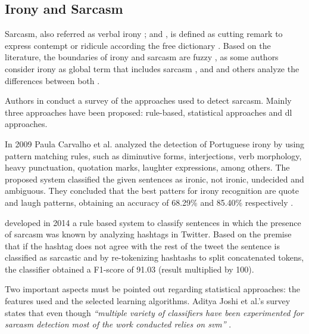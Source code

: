 \subsection{Irony and Sarcasm}
\label{subsec:irony_sarcasm}

Sarcasm, also referred as verbal irony \cite{giora2013negation}; \cite{giora2015defaultness} and \cite{giora2015default}, is defined as cutting remark to express contempt or ridicule according the free dictionary \cite{sarcasmFreeDictionary}. Based on the literature, the boundaries of irony and sarcasm are fuzzy \cite{bosco2013developing}, as some authors consider irony as global term that includes sarcasm \cite{gibbs1991psychological}, \cite{wilson2006pragmatics} and \cite{kreuz1993empirical} and others analyze the differences between both \cite{filatova2012irony}.

Authors in \cite{joshi2016automatic} conduct a survey of the approaches used to detect sarcasm. Mainly three approaches have been proposed: rule-based, statistical approaches and \acrlong{dl} approaches.

In 2009 Paula Carvalho et al. analyzed the detection of Portuguese irony by using pattern matching rules, such as diminutive forms, interjections, verb morphology, heavy punctuation, quotation marks, laughter expressions, among others. The proposed system classified the given sentences as ironic, not ironic, undecided and ambiguous. They concluded that the best patters for irony recognition are quote and laugh patterns, obtaining an accuracy of 68.29\% and 85.40\% respectively \cite{carvalho2009clues}.

\cite{maynard2014cares} developed in 2014 a rule based system to classify sentences in which the presence of sarcasm was known by analyzing hashtags in Twitter. Based on the premise that if the hashtag does not agree with the rest of the tweet the sentence is classified as sarcastic and by re-tokenizing hashtashs to split concatenated tokens, the classifier obtained a F1-score of 91.03 (result multiplied by 100).

Two important aspects must be pointed out regarding statistical approaches: the features used and the selected learning algorithms. Aditya Joshi et al.'s survey states that even though \textit{``multiple variety of classifiers have been experimented for sarcasm detection most of the work conducted relies on \acrshort{svm}''} \cite{joshi2016automatic}.

